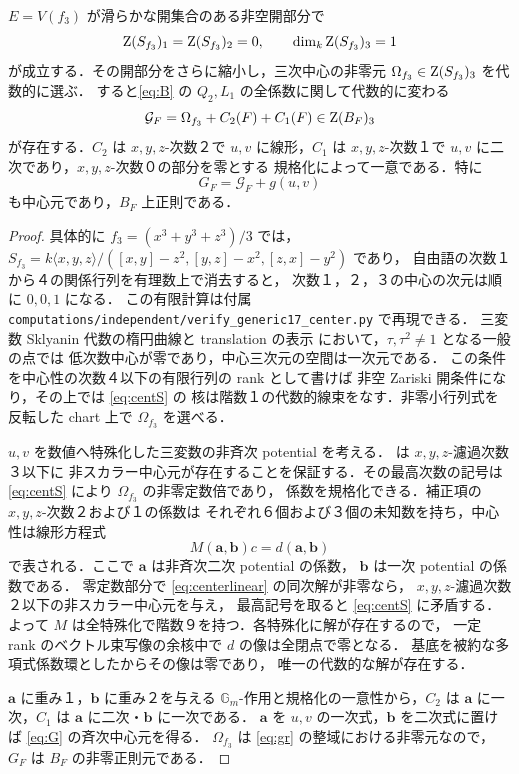 \begin{lemma}[一般点での三次中心元]\label{lem:center}
$E=V(f_3)$ が滑らかな開集合のある非空開部分で
\begin{equation}\label{eq:centS}
 \operatorname{Z}(S_{f_3})_1=\operatorname{Z}(S_{f_3})_2=0,\qquad
 \dim_k\operatorname{Z}(S_{f_3})_3=1
\end{equation}
が成立する．その開部分をさらに縮小し，三次中心の非零元
$\Omega_{f_3}\in\operatorname{Z}(S_{f_3})_3$ を代数的に選ぶ．
すると\eqref{eq:B} の $Q_2,L_1$ の全係数に関して代数的に変わる
\begin{equation}\label{eq:G}
 \mathcal G_F=\Omega_{f_3}+C_2(F)+C_1(F)\in\operatorname{Z}(B_F)_3
\end{equation}
が存在する．$C_2$ は $x,y,z$-次数２で $u,v$ に線形，$C_1$ は
$x,y,z$-次数１で $u,v$ に二次であり，$x,y,z$-次数０の部分を零とする
規格化によって一意である．特に
\begin{equation}\label{eq:Gg}
 G_F=\mathcal G_F+g(u,v)
\end{equation}
も中心元であり，$B_F$ 上正則である．
\end{lemma}
\begin{proof}
具体的に $f_3=(x^3+y^3+z^3)/3$ では，
$S_{f_3}=k\langle x,y,z\rangle/([x,y]-z^2,[y,z]-x^2,[z,x]-y^2)$ であり，
自由語の次数１から４の関係行列を有理数上で消去すると，
次数１，２，３の中心の次元は順に $0,0,1$ になる．
この有限計算は付属 \nolinkurl{computations/independent/verify_generic17_center.py} で再現できる．
三変数 Sklyanin 代数の楕円曲線と translation の表示
\cite{ATV,EG} において，$\tau,\tau^2\ne1$ となる一般の点では
低次数中心が零であり，中心三次元の空間は一次元である．
この条件を中心性の次数４以下の有限行列の rank として書けば
非空 Zariski 開条件になり，その上では \eqref{eq:centS} の
核は階数１の代数的線束をなす．非零小行列式を反転した
chart 上で $\Omega_{f_3}$ を選べる．

$u,v$ を数値へ特殊化した三変数の非斉次 potential を考える．
\cite[Theorem~3.3.2(ii)]{EG} は $x,y,z$-濾過次数３以下に
非スカラー中心元が存在することを保証する．その最高次数の記号は
\eqref{eq:centS} により $\Omega_{f_3}$ の非零定数倍であり，
係数を規格化できる．補正項の $x,y,z$-次数２および１の係数は
それぞれ６個および３個の未知数を持ち，中心性は線形方程式
\begin{equation}\label{eq:centerlinear}
 M(\mathbf a,\mathbf b)c=d(\mathbf a,\mathbf b)
\end{equation}
で表される．ここで $\mathbf a$ は非斉次二次 potential の係数，
$\mathbf b$ は一次 potential の係数である．
零定数部分で \eqref{eq:centerlinear} の同次解が非零なら，
$x,y,z$-濾過次数２以下の非スカラー中心元を与え，
最高記号を取ると \eqref{eq:centS} に矛盾する．
よって $M$ は全特殊化で階数９を持つ．各特殊化に解が存在するので，
一定 rank のベクトル束写像の余核中で $d$ の像は全閉点で零となる．
基底を被約な多項式係数環としたからその像は零であり，
唯一の代数的な解が存在する．

$\mathbf a$ に重み１，$\mathbf b$ に重み２を与える
$\mathbb G_m$-作用と規格化の一意性から，$C_2$ は
$\mathbf a$ に一次，$C_1$ は $\mathbf a$ に二次・$\mathbf b$ に一次である．
$\mathbf a$ を $u,v$ の一次式，$\mathbf b$ を二次式に置けば
\eqref{eq:G} の斉次中心元を得る．
$\Omega_{f_3}$ は \eqref{eq:gr} の整域における非零元なので，
$G_F$ は $B_F$ の非零正則元である．
\end{proof}


